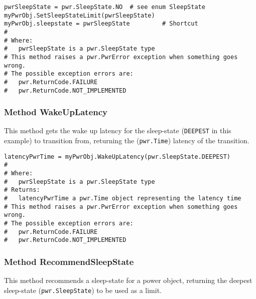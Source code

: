 \documentclass[12pt]{report} %
\begin{document}
\begin{appendices}
\begin{center}\begin{minipage}{.95\linewidth}\begin{lstlisting}
pwrSleepState = pwr.SleepState.NO  # see enum SleepState
myPwrObj.SetSleepStateLimit(pwrSleepState)
myPwrObj.sleepstate = pwrSleepState         # Shortcut
#
# Where:
#   pwrSleepState is a pwr.SleepState type
# This method raises a pwr.PwrError exception when something goes wrong.
# The possible exception errors are: 
#   pwr.ReturnCode.FAILURE
#   pwr.ReturnCode.NOT_IMPLEMENTED
\end{lstlisting}\end{minipage}\end{center}

\subsubsection{Method WakeUpLatency} \label{meth:WakeUpLatency}

This method gets the wake up latency for the sleep-state (\texttt{DEEPEST} in this example) to
transition from, returning the (\texttt{pwr.Time}) latency of the transition.

\begin{center}\begin{minipage}{.95\linewidth}\begin{lstlisting}
latencyPwrTime = myPwrObj.WakeUpLatency(pwr.SleepState.DEEPEST)
#
# Where:
#   pwrSleepState is a pwr.SleepState type
# Returns:
#   latencyPwrTime a pwr.Time object representing the latency time
# This method raises a pwr.PwrError exception when something goes wrong.
# The possible exception errors are: 
#   pwr.ReturnCode.FAILURE
#   pwr.ReturnCode.NOT_IMPLEMENTED
\end{lstlisting}\end{minipage}\end{center}

\subsubsection{Method RecommendSleepState} \label{meth:RecommendSleepState}

This method recommends a sleep-state for a power object, returning the deepest sleep-state
(\texttt{pwr.SleepState}) to be used as a limit.


\end{appendices}
\end{document}
